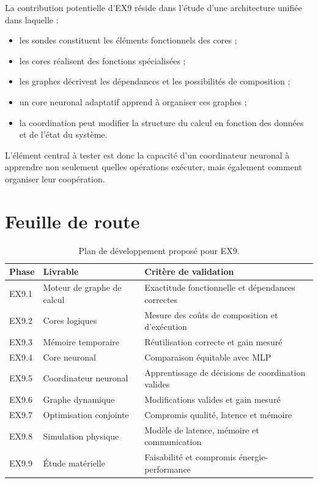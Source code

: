 \documentclass[11pt,a4paper]{article}
\begin{document}
La contribution potentielle d'EX9 réside dans l'étude d'une
architecture unifiée dans laquelle :

\begin{itemize}
  \item les sondes constituent les éléments fonctionnels des cores ;
  \item les cores réalisent des fonctions spécialisées ;
  \item les graphes décrivent les dépendances et les possibilités
        de composition ;
  \item un core neuronal adaptatif apprend à organiser ces graphes ;
  \item la coordination peut modifier la structure du calcul
        en fonction des données et de l'état du système.
\end{itemize}

L'élément central à tester est donc la capacité d'un coordinateur
neuronal à apprendre non seulement quelles opérations exécuter,
mais également comment organiser leur coopération.

\section{Feuille de route}

\begin{table}[H]
\centering
\small
\begin{tabularx}{\textwidth}{p{1.8cm}p{4.2cm}X}
\toprule
Phase & Livrable & Critère de validation \\
\midrule

EX9.1
& Moteur de graphe de calcul
& Exactitude fonctionnelle et dépendances correctes \\

EX9.2
& Cores logiques
& Mesure des coûts de composition et d'exécution \\

EX9.3
& Mémoire temporaire
& Réutilisation correcte et gain mesuré \\

EX9.4
& Core neuronal
& Comparaison équitable avec MLP \\

EX9.5
& Coordinateur neuronal
& Apprentissage de décisions de coordination valides \\

EX9.6
& Graphe dynamique
& Modifications valides et gain mesuré \\

EX9.7
& Optimisation conjointe
& Compromis qualité, latence et mémoire \\

EX9.8
& Simulation physique
& Modèle de latence, mémoire et communication \\

EX9.9
& Étude matérielle
& Faisabilité et compromis énergie-performance \\

\bottomrule
\end{tabularx}
\caption{Plan de développement proposé pour EX9.}
\end{table}
\end{document}
